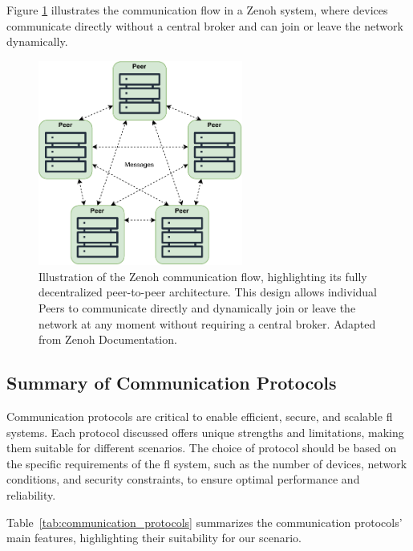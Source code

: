 Figure \ref{fig:zenoh_comm} illustrates the communication flow in a Zenoh system, where devices communicate directly without a central broker and can join or leave the network dynamically.

\begin{figure}[!htb]
    \centering
    \includegraphics[width=0.6\textwidth]{figs/zenoh_comm.pdf}
    \caption[Zenoh Communication Flow]{Illustration of the Zenoh communication flow, highlighting its fully decentralized peer-to-peer architecture. This design allows individual Peers to communicate directly and dynamically join or leave the network at any moment without requiring a central broker. Adapted from Zenoh Documentation.}
    \label{fig:zenoh_comm}
\end{figure}


\subsection{Summary of Communication Protocols}

Communication protocols are critical to enable efficient, secure, and scalable \ac{fl} systems. Each protocol discussed offers unique strengths and limitations, making them suitable for different scenarios. The choice of protocol should be based on the specific requirements of the \ac{fl} system, such as the number of devices, network conditions, and security constraints, to ensure optimal performance and reliability.

Table~\ref{tab:communication_protocols} summarizes the communication protocols' main features, highlighting their suitability for our scenario.

